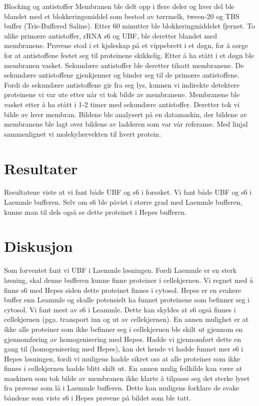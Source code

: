 \documentclass[
]{book}
\begin{document}
Blocking og antistoffer Membranen ble delt opp i flere deler og hver del ble blandet med et blokkeringsmiddel som bestod av tørrmelk, tween-20 og TBS buffer (Tris-Buffered Saline). Etter 60 minutter ble blokkeringmiddelet fjernet. To ulike primære antistoffer, rRNA s6 og UBF, ble deretter blandet med membranene. Prøvene stod i et kjøleskap på et vippebrett i et døgn, for å sørge for at antistoffene festet seg til proteinene skikkelig. Etter å ha stått i et døgn ble membranen vasket. Sekundære antistoffer ble deretter tilsatt membranene. De sekundære antistoffene gjenkjenner og binder seg til de primære antistoffene. Fordi de sekundære antistoffene gir fra seg lys, kunnen vi indirekte detektere proteinene vi var ute etter når vi tok bilde av membranene. Membranene ble vasket etter å ha stått i 1-2 timer med sekundære antistoffer. Deretter tok vi bilde av hver membran. Bildene ble analysert på en datamaskin, der bildene av membranene ble lagt over bildene av ladderen som var vår referanse. Med linjal sammenlignet vi molekylærvekten til hvert protein.

\hypertarget{resultater}{%
\section{Resultater}\label{resultater}}

Resultatene viste at vi fant både UBF og s6 i forsøket. Vi fant både UBF og s6 i Laemmle bufferen. Selv om s6 ble påvist i større grad med Laemmle bufferen, kunne man til dels også se dette proteinet i Hepes bufferen.

\hypertarget{diskusjon}{%
\section{Diskusjon}\label{diskusjon}}

Som forventet fant vi UBF i Laemmle løsningen. Fordi Laemmle er en sterk løsning, skal denne bufferen kunne finne proteiner i cellekjernen. Vi regnet med å finne s6 med Hepes siden dette proteinet finnes i cytosol. Hepes er en svakere buffer enn Leammle og skulle potensielt ha funnet proteinene som befinner seg i cytosol. Vi fant mest av s6 i Leammle. Dette kan skyldes at s6 også finnes i cellekjernen (pga. transport inn og ut av cellekjernen). En annen mulighet er at ikke alle proteiner som ikke befinner seg i cellekjernen ble skilt ut gjennom en gjennomføring av homogenisering med Hepes. Hadde vi gjennomført dette en gang til (homogenisering med Hepes), kan det hende vi hadde funnet mer s6 i Hepes løsningen, fordi vi muligens hadde sikret oss at alle proteiner som ikke finnes i cellekjernen hadde blitt skilt ut. En annen mulig feilkilde kan være at maskinen som tok bilde av membranen ikke klarte å tilpasse seg det sterke lyset fra prøvene som lå i Laemmle bufferen. Dette kan muligens forklare de svake båndene som viste s6 i Hepes prøvene på bildet som ble tatt.
\end{document}
